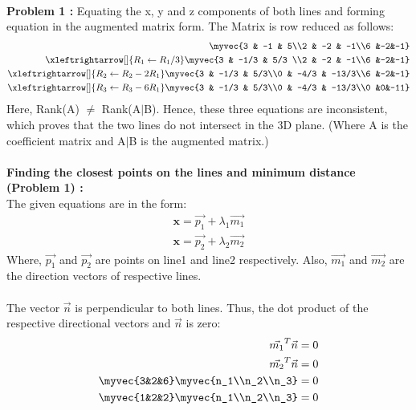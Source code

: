 \documentclass[journal,12pt,twocolumn]{IEEEtran}
\begin{document}
\\
\textbf{Problem 1 :} Equating the x, y and z components of both lines and forming equation in the augmented matrix form. The Matrix is row reduced as follows:
\begin{align}
\myvec{3 & -1 & 5\\2 & -2 & -1\\6 &-2&-1}\\
\xleftrightarrow[]{R_1\leftarrow R_1/3}
\myvec{3 & -1/3 & 5/3 \\2 & -2 & -1\\6 &-2&-1}\\
\xleftrightarrow[]{R_2\leftarrow R_2-2R_1}   
\myvec{3 & -1/3 & 5/3\\0 & -4/3 & -13/3\\6 &-2&-1}\\
\xleftrightarrow[]{R_3\leftarrow R_3-6R_1}
\myvec{3 & -1/3 & 5/3\\0 & -4/3 & -13/3\\0 &0&-11}
\end{align} 
Here, Rank(A) $\neq$ Rank(A$\mid$B). Hence, these three equations are inconsistent, which proves that the two lines do not intersect in the 3D plane. (Where A is the coefficient matrix and A$\mid$B is the augmented matrix.) \\
\\
\textbf{Finding the closest points on the lines and minimum distance (Problem 1) :}
\\
The given equations are in the form:
\begin{align}
    \textbf{x}=\vec{p_1} + \lambda_1\vec{m_1}\\
    \textbf{x}=\vec{p_2} + \lambda_2\vec{m_2}
\end{align}
\newline
Where, $\vec{p_1}$ and $\vec{p_2}$ are points on line1 and line2 respectively. Also, $\vec{m_1}$ and $\vec{m_2}$ are the direction vectors of respective lines.
\\ \\
The vector $\vec{n}$ is perpendicular to both lines. Thus, the dot product of the respective directional vectors and  $\vec{n}$ is zero:
\begin{align}
    \vec{m_1}^T\vec{n} =  0\\
    \vec{m_2}^T\vec{n} =  0\\
    \myvec{3&2&6}\myvec{n_1\\n_2\\n_3}=0\\
    \myvec{1&2&2}\myvec{n_1\\n_2\\n_3}=0
\end{align}
\end{document}
